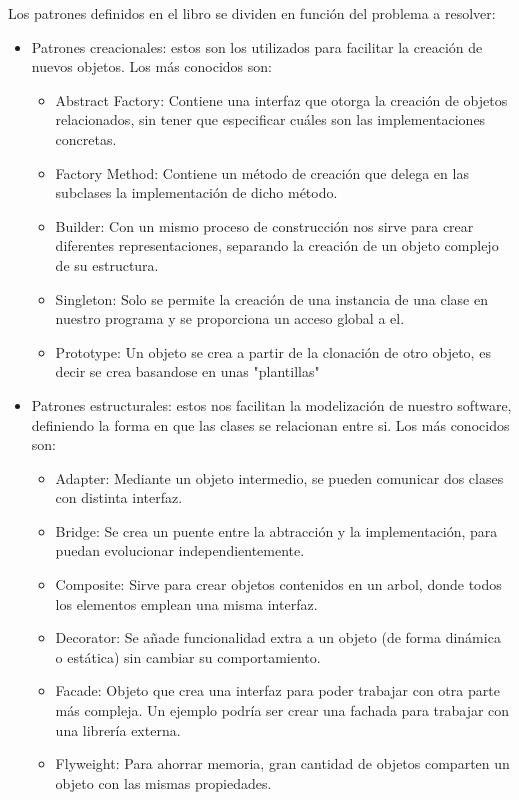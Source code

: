 \documentclass[12pt]{report} %
\begin{document}
	 Los patrones definidos en el libro \cite{gamma2002patrones} se dividen en función del problema a resolver:
	 
	 \begin{itemize}
	 	\item Patrones creacionales: estos son los utilizados para facilitar la creación de nuevos objetos. Los más conocidos son:	 	
	 	\begin{itemize}
	 		\item Abstract Factory: Contiene una interfaz que otorga la creación de objetos relacionados, sin tener que especificar cuáles son las implementaciones concretas.
	 		\item Factory Method: Contiene un método de creación que delega en las subclases la implementación de dicho método.
	 		\item Builder: Con un mismo proceso de construcción nos sirve para crear diferentes representaciones, separando la creación de un objeto complejo de su estructura.
	 		\item Singleton: Solo se permite la creación de una instancia de una clase en nuestro programa y se proporciona un acceso global a el.
	 		\item Prototype: Un objeto se crea a partir de la clonación de otro objeto, es decir se crea basandose en unas "plantillas"
	 	\end{itemize}
 	\item Patrones estructurales: estos nos facilitan la modelización de nuestro software, definiendo la forma en que las clases se relacionan entre si. Los más conocidos son:
 	\begin{itemize}
 		\item Adapter: Mediante un objeto intermedio, se pueden comunicar dos clases con distinta interfaz. 
 		\item Bridge: Se crea un puente entre la abtracción y la implementación, para puedan evolucionar independientemente.
 		\item Composite: Sirve para crear objetos contenidos en un arbol, donde todos los elementos emplean una misma interfaz.
 		\item Decorator: Se añade funcionalidad extra a un objeto (de forma dinámica o estática) sin cambiar su comportamiento.
 		\item Facade: Objeto que crea una interfaz para poder trabajar con otra parte más compleja. Un ejemplo podría ser crear una fachada para trabajar con una librería externa.
 		\item Flyweight: Para ahorrar memoria, gran cantidad de objetos comparten un objeto con las mismas propiedades.

\end{itemize}
\end{itemize}
\end{document}

